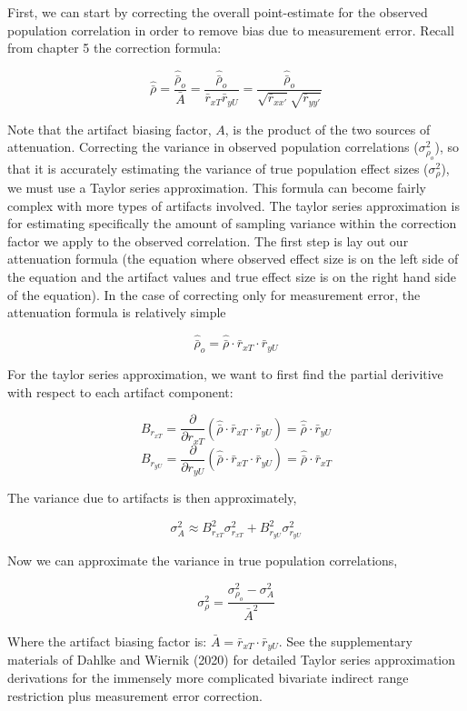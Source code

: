 \documentclass[
  letterpaper,
  DIV=11,
  numbers=noendperiod]{scrreprt}
\begin{document}
First, we can start by correcting the overall point-estimate for the
observed population correlation in order to remove bias due to
measurement error. Recall from chapter 5 the correction formula:

\[
\hat{\bar{\rho}} = \frac{\hat{\bar{\rho}}_o}{\bar{A}} = \frac{\hat{\bar{\rho}}_o}{\bar{r}_{xT} \bar{r}_{yU}} = \frac{\hat{\bar{\rho}}_o}{\sqrt{\bar{r}_{xx'}} \sqrt{\bar{r}_{yy'}}}
\]

Note that the artifact biasing factor, \(A\), is the product of the two
sources of attenuation. Correcting the variance in observed population
correlations (\(\sigma^2_{\rho_o}\)), so that it is accurately
estimating the variance of true population effect sizes
(\(\sigma^2_{\rho}\)), we must use a Taylor series approximation. This
formula can become fairly complex with more types of artifacts involved.
The taylor series approximation is for estimating specifically the
amount of sampling variance within the correction factor we apply to the
observed correlation. The first step is lay out our attenuation formula
(the equation where observed effect size is on the left side of the
equation and the artifact values and true effect size is on the right
hand side of the equation). In the case of correcting only for
measurement error, the attenuation formula is relatively simple

\[
\hat{\bar{\rho}}_o = \hat{\bar{\rho}}\cdot \bar{r}_{xT}\cdot \bar{r}_{yU}
\]

For the taylor series approximation, we want to first find the partial
derivitive with respect to each artifact component:

\[
B_{r_{xT}}=\frac{\partial}{\partial r_{xT}} (\hat{\bar{\rho}}\cdot \bar{r}_{xT}\cdot \bar{r}_{yU}) = \hat{\bar{\rho}}\cdot \bar{r}_{yU}
\] \[
B_{r_{yU}}=\frac{\partial}{\partial r_{yU}} (\hat{\bar{\rho}}\cdot \bar{r}_{xT}\cdot \bar{r}_{yU}) = \hat{\bar{\rho}}\cdot \bar{r}_{xT}
\]

The variance due to artifacts is then approximately,

\[
\sigma^2_A\approx B^2_{r_{xT}} \sigma^2_{r_{xT}} + B^2_{r_{yU}} \sigma^2_{r_{yU}}
\]

Now we can approximate the variance in true population correlations,

\[
\sigma_\rho^2= \frac{\sigma^2_{\rho_o} - \sigma^2_A}{\bar{A}^2}
\]

Where the artifact biasing factor is:
\(\bar{A}=\bar{r}_{xT}\cdot \bar{r}_{yU}\). See the supplementary
materials of Dahlke and Wiernik (2020) for detailed Taylor series
approximation derivations for the immensely more complicated bivariate
indirect range restriction plus measurement error correction.
\end{document}
